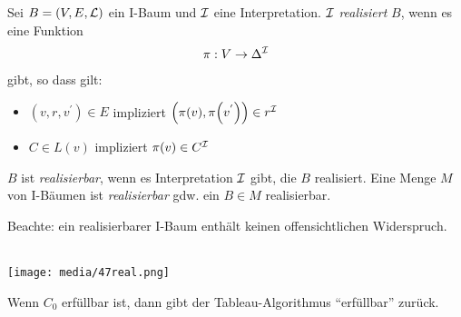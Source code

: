 \begin{definition}[Realisierbarkeit]
    \label{def:realisierbarkeit}
Sei $B = \left( V,E,\ML \right)$ ein I-Baum und $\mathcal{I}$ eine Interpretation. $\mathcal{I}$
\emph{realisiert} $B$, wenn es eine Funktion
\begin{align*}
    \pi : V \rightarrow \Delta^{\mathcal{I}}
\end{align*}
gibt, so dass gilt:
\begin{itemize}
\item
  $\left( v,r,v^{'} \right) \in E$ impliziert
  $\left( \pi\left( v \right),\pi\left( v^{'} \right) \right) \in r^\MI$
\item
  $C \in L\left( v \right)$ impliziert
  $\pi\left( v \right) \in C^\MI$
\end{itemize}

$B$ ist \emph{realisierbar}, wenn es Interpretation $\mathcal{I}$ gibt, die $B$
realisiert. Eine Menge $M$ von I-Bäumen ist \emph{realisierbar} gdw. ein
$B \in M$ realisierbar.
\end{definition}

Beachte: ein realisierbarer I-Baum enthält keinen offensichtlichen Widerspruch.

\begin{tafel}\mbox{}\\

\texttt{[image: media/47real.png]}
\end{tafel}

\begin{theorem}
    Wenn $C_{0}$ erfüllbar ist, dann gibt der Tableau-Algorithmus \enquote{erfüllbar}
zurück.
\end{theorem}

